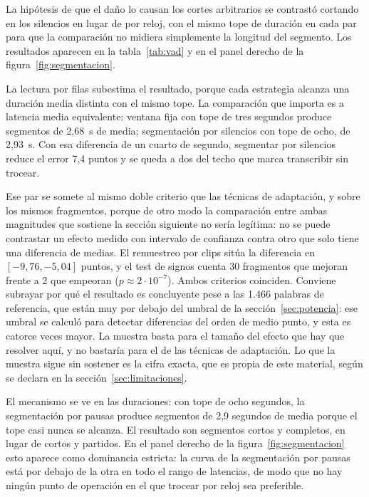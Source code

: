 La hipótesis de que el daño lo causan los cortes arbitrarios se contrastó cortando en los
silencios en lugar de por reloj, con el mismo tope de duración en cada par para que la
comparación no midiera simplemente la longitud del segmento. Los resultados aparecen en la
tabla~\ref{tab:vad} y en el panel derecho de la figura~\ref{fig:segmentacion}.



La lectura por filas subestima el resultado, porque cada estrategia alcanza una duración
media distinta con el mismo tope. La comparación que importa es a latencia media
equivalente: ventana fija con tope de tres segundos produce segmentos de 2,68~s de media;
segmentación por silencios con tope de ocho, de 2,93~s. Con esa diferencia de un cuarto de
segundo, segmentar por silencios reduce el error 7,4 puntos y se queda a dos del techo que
marca transcribir sin trocear.

Ese par se somete al mismo doble criterio que las técnicas de adaptación, y sobre los mismos
fragmentos, porque de otro modo la comparación entre ambas magnitudes que sostiene la
sección siguiente no sería legítima: no se puede contrastar un efecto medido con intervalo
de confianza contra otro que solo tiene una diferencia de medias. El remuestreo por clips
sitúa la diferencia en $[-9{,}76, -5{,}04]$ puntos, y el test de signos cuenta 30 fragmentos
que mejoran frente a 2 que empeoran ($p \approx 2\cdot10^{-7}$). Ambos criterios coinciden.
Conviene subrayar por qué el resultado es concluyente pese a las 1.466 palabras de
referencia, que están muy por debajo del umbral de la sección~\ref{sec:potencia}: ese umbral
se calculó para detectar diferencias del orden de medio punto, y esta es catorce veces
mayor. La muestra basta para el tamaño del efecto que hay que resolver aquí, y no bastaría
para el de las técnicas de adaptación. Lo que la muestra sigue sin sostener es la cifra
exacta, que es propia de este material, según se declara en la
sección~\ref{sec:limitaciones}.

El mecanismo se ve en las duraciones: con tope de ocho segundos, la segmentación por pausas
produce segmentos de 2,9 segundos de media porque el tope casi nunca se alcanza. El
resultado son segmentos cortos y completos, en lugar de cortos y partidos. En el panel
derecho de la figura~\ref{fig:segmentacion} esto aparece como dominancia estricta: la curva
de la segmentación por pausas está por debajo de la otra en todo el rango de latencias, de
modo que no hay ningún punto de operación en el que trocear por reloj sea preferible.

